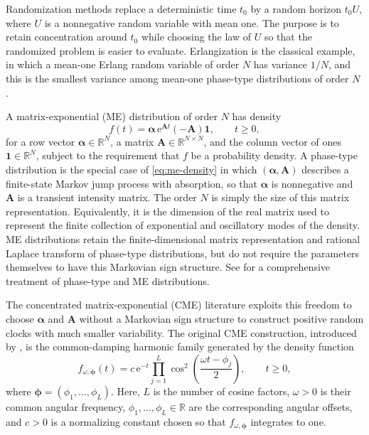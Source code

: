 \documentclass[11pt]{article}
\numberwithin{equation}{section}
\theoremstyle{remark}
\newcommand{\R}{\mathbb R}
\newcommand{\e}{\mathrm e}
\begin{document}
Randomization methods replace a deterministic time $t_0$ by a random horizon $t_0U$, where $U$ is a nonnegative random variable with mean one. The purpose is to retain concentration around $t_0$ while choosing the law of $U$ so that the randomized problem is easier to evaluate. Erlangization is the classical example, in which a mean-one Erlang random variable of order $N$ has variance $1/N$, and this is the smallest variance among mean-one phase-type distributions of order $N$ \citep{AldousShepp1987}.

A matrix-exponential (ME) distribution of order $N$ has density
\begin{equation}\label{eq:me-density}
  f(t)=\bm\alpha\,\e^{\bm A t}(-\bm A)\bm 1,
  \qquad t\geq0,
\end{equation}
for a row vector $\bm\alpha\in\R^N$, a matrix $\bm A \in \R^{N \times N}$, and the column vector of ones $\bm 1\in\R^N$, subject to the requirement that $f$ be a probability density. A phase-type distribution is the special case of \eqref{eq:me-density} in which $(\bm\alpha,\bm A)$ describes a finite-state Markov jump process with absorption, so that $\bm\alpha$ is nonnegative and $\bm A$ is a transient intensity matrix. The order $N$ is simply the size of this matrix representation. Equivalently, it is the dimension of the real matrix used to represent the finite collection of exponential and oscillatory modes of the density. ME distributions retain the finite-dimensional matrix representation and rational Laplace transform of phase-type distributions, but do not require the parameters themselves to have this Markovian sign structure. See \citet[Chapters~3--4]{BladtNielsen2017} for a comprehensive treatment of phase-type and ME distributions.

The concentrated matrix-exponential (CME) literature exploits this freedom to choose $\bm\alpha$ and $\bm A$ without a Markovian sign structure to construct positive random clocks with much smaller variability. The original CME construction, introduced by \citet{HorvathSafarTelekZambo2016}, is the common-damping harmonic family generated by the density function
\begin{equation}\label{eq:intro-original-family}
  f_{\omega,\bm\phi}(t)
  ={c\,}\e^{-t}\prod_{j=1}^{L}
    \cos^2\!\left(\frac{\omega t-\phi_j}{2}\right),
  \qquad t\geq0,
\end{equation}
where $\bm\phi=(\phi_1,\ldots,\phi_L)$. Here, $L$ is the number of cosine factors, $\omega>0$ is their common angular frequency, $\phi_1,\ldots,\phi_L\in\R$ are the corresponding angular offsets, and $c>0$ is a normalizing constant chosen so that $f_{\omega,\bm\phi}$ integrates to one.
\end{document}
